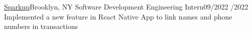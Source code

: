 \resumeSubheading
{\href{https://sparkupbiz.us}{Sparkup}}{Brooklyn, NY}
{Software Development Engineering Intern}{09/2022 /2022}
\resumeItemListStart
{}
{Implemented a new feature in React Native App to link names and phone numbers in transactions}
\resumeItemListEnd
